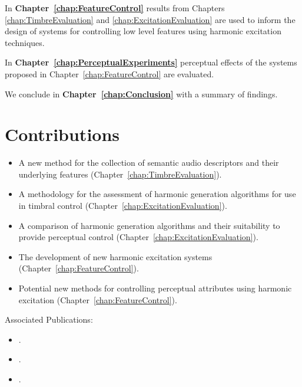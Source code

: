 	In {\bf{Chapter~\ref{chap:FeatureControl}}} results from Chapters \ref{chap:TimbreEvaluation} and
	\ref{chap:ExcitationEvaluation} are used to inform the design of systems for controlling low level features using
	harmonic excitation techniques.

	In {\bf{Chapter~\ref{chap:PerceptualExperiments}}} perceptual effects of the systems proposed in
	Chapter~\ref{chap:FeatureControl} are evaluated. 

	\note
	{
		We conclude in {\bf{Chapter~\ref{chap:Conclusion}}} with a summary of findings.
	}

\section{Contributions}
\label{sec:Introduction-Contributions}

	\begin{itemize}
		\item A new method for the collection of semantic audio descriptors and their underlying features
		      (Chapter~\ref{chap:TimbreEvaluation}).
		\item A methodology for the assessment of harmonic generation algorithms for use in timbral control
		      (Chapter~\ref{chap:ExcitationEvaluation}).
		\item A comparison of harmonic generation algorithms and their suitability to provide perceptual control
		      (Chapter~\ref{chap:ExcitationEvaluation}).
		\item The development of new harmonic excitation systems (Chapter~\ref{chap:FeatureControl}).
		\item Potential new methods for controlling perceptual attributes using harmonic excitation
		      (Chapter~\ref{chap:FeatureControl}).
	\end{itemize}

	Associated Publications:

	\begin{itemize}
		\item {}.
		\item {}.
		\item {}.
	\end{itemize}

